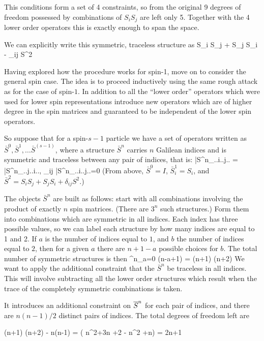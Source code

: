 This conditions form a set of 4 constraints, so from the original 9 degrees of freedom possessed by combinations of $S_i S_j$ are left only 5.  Together with the 4 lower order operators this is exactly enough to span the space.

We can explicitly write this symmetric, traceless structure as
\beq
	 S_i S_j + S_j S_i - \delta_{ij} S^2
\eeq

Having explored how the procedure works for spin-1, move on to consider the general spin case.   The idea is to proceed inductively using the same rough attack as for the case of spin-$1$.  In addition to all the ``lower order'' operators which were used for lower spin representations introduce new operators which are of higher degree in the spin matrices and guaranteed to be independent of the lower spin operators.

So suppose that for a spin-$s-1$ particle we have a set of operators written as $\bar{S}^0, \bar{S}^1, \ldots \bar{S}^{(s-1)}$, where a structure $\bar{S}^n$ carries $n$ Galilean indices and is symmetric and traceless between any pair of indices, that is:
\beq
	\bar{S}^n_{..i..j..} = \bar{S}^n_{..j..i..}, \; \delta_{ij} \bar{S}^n_{..i..j..}=0
\eeq 
(From above, $\bar{S}^0=I$, $\bar{S}^1_i = S_i$, and $\bar{S}^2 = S_i S_j + S_j S_i + \delta_{ij} S^2$.) 

The objects $\bar{S}^n$ are built as follows: start with all combinations involving the product of exactly $n$ spin matrices.  (There are $3^n$ such structures.)  Form them into combinations which are symmetric in all indices.  Each index has three possible values, so we can label each structure by how many indices are equal to 1 and 2.  If $a$ is the number of indices equal to $1$, and $b$ the number of indices equal to $2$, then for a given $a$ there are $n+1-a$ possible choices for $b$.  The total number of symmetric structures is then
\beq
	\Sigma^n_{a=0} (n-a+1) =  (n+1) (n+2)
\eeq
We want to apply the additional constraint that the $\bar{S}^n$ be traceless in all indices.  This will involve subtracting all the lower order structures which result when the trace of the completely symmetric combinations is taken.  %

It introduces an additional constraint on $\overline{S}^n$ for each pair of indices, and there are $n (n-1)/2$ distinct pairs of indices.  The total degrees of freedom left are

\beq
	 (n+1) (n+2) -  n(n-1) 
		= \left( n^2+3n +2 - n^2 +n\right )
		= 2n+1
\eeq

